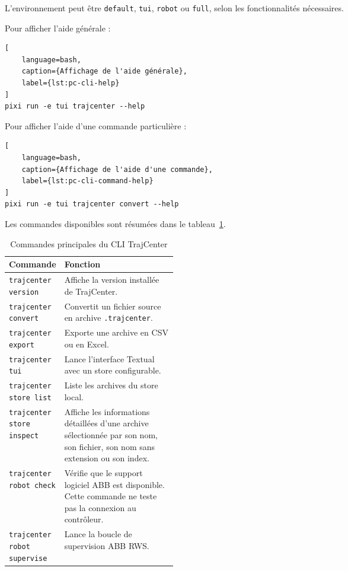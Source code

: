 \documentclass{rapportENSAM}
\begin{document}
L'environnement peut être \texttt{default}, \texttt{tui}, \texttt{robot} ou
\texttt{full}, selon les fonctionnalités nécessaires.

Pour afficher l'aide générale :

\begin{lstlisting}[
    language=bash,
    caption={Affichage de l'aide générale},
    label={lst:pc-cli-help}
]
pixi run -e tui trajcenter --help
\end{lstlisting}

Pour afficher l'aide d'une commande particulière :

\begin{lstlisting}[
    language=bash,
    caption={Affichage de l'aide d'une commande},
    label={lst:pc-cli-command-help}
]
pixi run -e tui trajcenter convert --help
\end{lstlisting}

Les commandes disponibles sont résumées dans le
tableau~\ref{tab:pc-cli-commands}.

\begin{table}[ht]
    \centering
    \small
    \begin{tabularx}{\linewidth}{
        |p{0.33\linewidth}
        |X|
    }
        \hline
        \textbf{Commande} &
        \textbf{Fonction} \\
        \hline

        \texttt{trajcenter version} &
        Affiche la version installée de TrajCenter. \\
        \hline

        \texttt{trajcenter convert} &
        Convertit un fichier source en archive
        \texttt{.trajcenter}. \\
        \hline

        \texttt{trajcenter export} &
        Exporte une archive en CSV ou en Excel. \\
        \hline

        \texttt{trajcenter tui} &
        Lance l'interface Textual avec un store configurable. \\
        \hline

        \texttt{trajcenter store list} &
        Liste les archives du store local. \\
        \hline

        \texttt{trajcenter store inspect} &
        Affiche les informations détaillées d'une archive sélectionnée par
        son nom, son fichier, son nom sans extension ou son index. \\
        \hline

        \texttt{trajcenter robot check} &
        Vérifie que le support logiciel ABB est disponible. Cette commande ne
        teste pas la connexion au contrôleur. \\
        \hline

        \texttt{trajcenter robot supervise} &
        Lance la boucle de supervision ABB RWS. \\
        \hline
    \end{tabularx}
    \caption{Commandes principales du CLI TrajCenter}
    \label{tab:pc-cli-commands}
\end{table}
\end{document}
